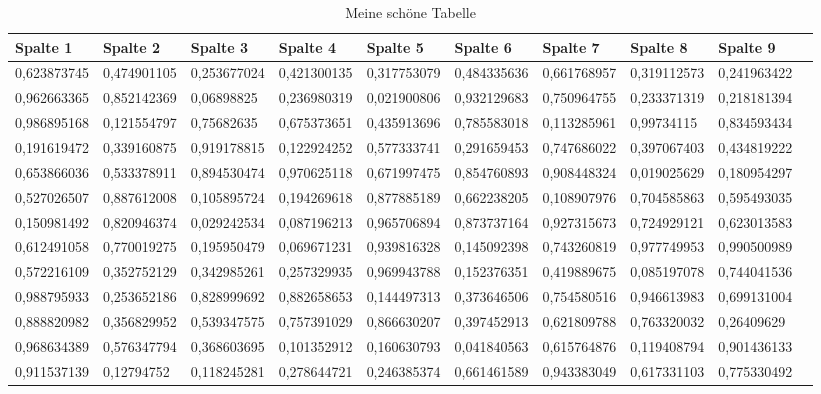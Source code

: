\documentclass[12pt,ngerman,parskip=half]{scrartcl}
\begin{document}
\begin{landscape}

\begin{table}
\caption{Meine schöne Tabelle}\label{tab:breite}
\begin{center}
\begin{tabular}{llllllllll} \toprule
Spalte 1 	&	Spalte 2	&	Spalte 3	&	Spalte 4	&	Spalte 5	&	Spalte 6	&	Spalte 7	&	Spalte 8	&	Spalte 9	\\ \midrule
0,623873745	&	0,474901105	&	0,253677024	&	0,421300135	&	0,317753079	&	0,484335636	&	0,661768957	&	0,319112573	&	0,241963422	\\
0,962663365	&	0,852142369	&	0,06898825	&	0,236980319	&	0,021900806	&	0,932129683	&	0,750964755	&	0,233371319	&	0,218181394	\\
0,986895168	&	0,121554797	&	0,75682635	&	0,675373651	&	0,435913696	&	0,785583018	&	0,113285961	&	0,99734115	&	0,834593434	\\
0,191619472	&	0,339160875	&	0,919178815	&	0,122924252	&	0,577333741	&	0,291659453	&	0,747686022	&	0,397067403	&	0,434819222	\\
0,653866036	&	0,533378911	&	0,894530474	&	0,970625118	&	0,671997475	&	0,854760893	&	0,908448324	&	0,019025629	&	0,180954297	\\
0,527026507	&	0,887612008	&	0,105895724	&	0,194269618	&	0,877885189	&	0,662238205	&	0,108907976	&	0,704585863	&	0,595493035	\\
0,150981492	&	0,820946374	&	0,029242534	&	0,087196213	&	0,965706894	&	0,873737164	&	0,927315673	&	0,724929121	&	0,623013583	\\
0,612491058	&	0,770019275	&	0,195950479	&	0,069671231	&	0,939816328	&	0,145092398	&	0,743260819	&	0,977749953	&	0,990500989	\\
0,572216109	&	0,352752129	&	0,342985261	&	0,257329935	&	0,969943788	&	0,152376351	&	0,419889675	&	0,085197078	&	0,744041536	\\
0,988795933	&	0,253652186	&	0,828999692	&	0,882658653	&	0,144497313	&	0,373646506	&	0,754580516	&	0,946613983	&	0,699131004	\\
0,888820982	&	0,356829952	&	0,539347575	&	0,757391029	&	0,866630207	&	0,397452913	&	0,621809788	&	0,763320032	&	0,26409629	\\
0,968634389	&	0,576347794	&	0,368603695	&	0,101352912	&	0,160630793	&	0,041840563	&	0,615764876	&	0,119408794	&	0,901436133	\\
0,911537139	&	0,12794752	&	0,118245281	&	0,278644721	&	0,246385374	&	0,661461589	&	0,943383049	&	0,617331103	&	0,775330492	\\

\end{tabular}
\end{center}
\end{table}
\end{landscape}
\end{document}
